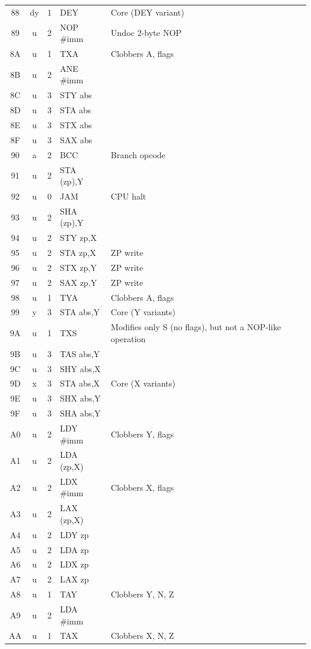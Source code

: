 \documentclass{article}
\begin{document}
{\begin{longtable}{@{}ccclp{4.8cm}@{}}
88 & dy & 1 & DEY & Core (DEY variant) \\
89 & u  & 2 & NOP \#imm & Undoc 2-byte NOP \\
8A & u  & 1 & TXA & Clobbers A, flags \\
8B & u  & 2 & ANE \#imm & \\
8C & u  & 3 & STY abs & \\
8D & u  & 3 & STA abs & \\
8E & u  & 3 & STX abs & \\
8F & u  & 3 & SAX abs & \\
90 & a  & 2 & BCC & Branch opcode \\
91 & u  & 2 & STA (zp),Y & \\
92 & u  & 0 & JAM & CPU halt \\
93 & u  & 2 & SHA (zp),Y & \\
94 & u  & 2 & STY zp,X & \\
95 & u  & 2 & STA zp,X & ZP write \\
96 & u  & 2 & STX zp,Y & ZP write \\
97 & u  & 2 & SAX zp,Y & ZP write \\
98 & u  & 1 & TYA & Clobbers A, flags \\
99 & y  & 3 & STA abs,Y & Core (Y variants) \\
9A & u  & 1 & TXS & Modifies only S (no flags), but not a NOP-like operation \\
9B & u  & 3 & TAS abs,Y & \\
9C & u  & 3 & SHY abs,X & \\
9D & x  & 3 & STA abs,X & Core (X variants) \\
9E & u  & 3 & SHX abs,Y & \\
9F & u  & 3 & SHA abs,Y & \\
A0 & u  & 2 & LDY \#imm & Clobbers Y, flags \\
A1 & u  & 2 & LDA (zp,X) & \\
A2 & u  & 2 & LDX \#imm & Clobbers X, flags \\
A3 & u  & 2 & LAX (zp,X) & \\
A4 & u  & 2 & LDY zp & \\
A5 & u  & 2 & LDA zp & \\
A6 & u  & 2 & LDX zp & \\
A7 & u  & 2 & LAX zp & \\
A8 & u  & 1 & TAY & Clobbers Y, N, Z \\
A9 & u  & 2 & LDA \#imm & \\
AA & u  & 1 & TAX & Clobbers X, N, Z \\

\end{longtable}}
\end{document}
